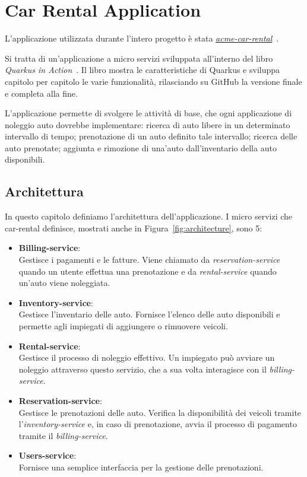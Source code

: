 \chapter{Car Rental Application}
L'applicazione utilizzata durante l'intero progetto è stata \href{https://github.com/xstefank/quarkus-in-action}{\textit{acme-car-rental}}~\cite{quarkusinaction_repo}.

Si tratta di un'applicazione a micro servizi sviluppata all'interno del libro \textit{Quarkus in Action}~\cite{quarkusinaction}. Il libro mostra le caratteristiche di Quarkus e sviluppa capitolo per capitolo le varie funzionalità, rilasciando su GitHub la versione finale e completa alla fine.

L'applicazione permette di svolgere le attività di base, che ogni applicazione di noleggio auto dovrebbe implementare: ricerca di auto libere in un determinato intervallo di tempo; prenotazione di un auto definito tale intervallo; ricerca delle auto prenotate; aggiunta e rimozione di una'auto dall'inventario della auto disponibili.

\section{Architettura}
\label{sec:servizi}
In questo capitolo definiamo l'architettura dell'applicazione. I micro servizi che car-rental definisce, mostrati anche in Figura~\ref{fig:architecture}, sono 5:
\begin{itemize}
    \item \textbf{Billing-service}: \\
        Gestisce i pagamenti e le fatture. Viene chiamato da \textit{reservation-service} quando un utente effettua una prenotazione e da \textit{rental-service} quando un'auto viene noleggiata.
    \item \textbf{Inventory-service}: \\
        Gestisce l'inventario delle auto. Fornisce l'elenco delle auto disponibili e permette agli impiegati di aggiungere o rimuovere veicoli.
    \item \textbf{Rental-service}: \\
        Gestisce il processo di noleggio effettivo. Un impiegato può avviare un noleggio attraverso questo servizio, che a sua volta interagisce con il \textit{billing-service}.
    \item \textbf{Reservation-service}: \\
        Gestisce le prenotazioni delle auto. Verifica la disponibilità dei veicoli tramite l'\textit{inventory-service} e, in caso di prenotazione, avvia il processo di pagamento tramite il \textit{billing-service}.
    \item \textbf{Users-service}: \\
        Fornisce una semplice interfaccia per la gestione delle prenotazioni.
\end{itemize}

